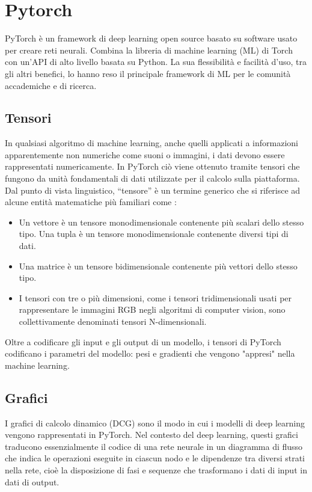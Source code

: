 \section{Pytorch}

PyTorch è un framework di deep learning open source basato su software usato per creare reti neurali.
Combina la libreria di machine learning (ML) di Torch con un'API di alto livello basata su Python.
La sua flessibilità e facilità d'uso, tra gli altri benefici, lo hanno reso il principale framework di ML per le comunità accademiche e di ricerca.

\subsection{Tensori}

In qualsiasi algoritmo di machine learning, anche quelli applicati a informazioni apparentemente non numeriche come suoni o immagini, i dati devono essere rappresentati numericamente.
In PyTorch ciò viene ottenuto tramite tensori che fungono da unità fondamentali di dati utilizzate per il calcolo sulla piattaforma. \\

\noindent
Dal punto di vista linguistico, “tensore” è un termine generico che si riferisce ad alcune entità matematiche più familiari come :
\begin{itemize}
    \item Un vettore è un tensore monodimensionale contenente più scalari dello stesso tipo. Una tupla è un tensore monodimensionale contenente diversi tipi di dati.
    \item Una matrice è un tensore bidimensionale contenente più vettori dello stesso tipo.
    \item I tensori con tre o più dimensioni, come i tensori tridimensionali usati per rappresentare le immagini RGB negli algoritmi di computer vision, sono collettivamente denominati tensori N-dimensionali.
\end{itemize}

\noindent
Oltre a codificare gli input e gli output di un modello, i tensori di PyTorch codificano i parametri del modello: pesi e gradienti che vengono "appresi" nella machine learning.

\subsection{Grafici}
I grafici di calcolo dinamico (DCG) sono il modo in cui i modelli di deep learning vengono rappresentati in PyTorch.
Nel contesto del deep learning, questi grafici traducono essenzialmente il codice di una rete neurale in un diagramma di flusso che indica le operazioni eseguite in ciascun nodo e le dipendenze tra diversi strati nella rete,
cioè la disposizione di fasi e sequenze che trasformano i dati di input in dati di output. \cite{pytorch}
